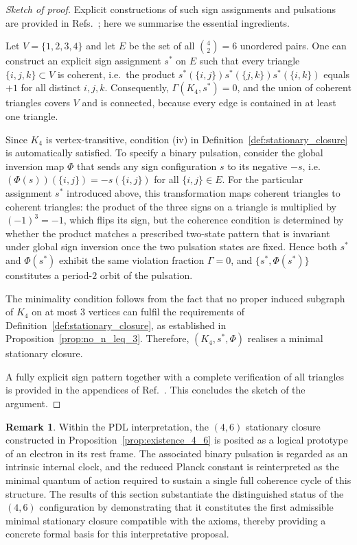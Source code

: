 \documentclass[11pt,a4paper]{article}
\theoremstyle{definition}
\newtheorem{remark}[theorem]{Remark}
\begin{document}
\begin{proof}[Sketch of proof]
Explicit constructions of such sign assignments and pulsations are provided in Refs.~\cite{PDL_Main_2026,PDL_Intro_2026}; here we summarise the essential ingredients.

Let $V=\{1,2,3,4\}$ and let $E$ be the set of all $\binom{4}{2}=6$ unordered pairs. One can construct an explicit sign assignment $s^\ast$ on $E$ such that every triangle $\{i,j,k\}\subset V$ is coherent, i.e.\ the product $s^\ast(\{i,j\})s^\ast(\{j,k\})s^\ast(\{i,k\})$ equals $+1$ for all distinct $i,j,k$.\cite{PDL_Main_2026} Consequently, $\Gamma(K_4,s^\ast)=0$, and the union of coherent triangles covers $V$ and is connected, because every edge is contained in at least one triangle.

Since $K_4$ is vertex-transitive, condition (iv) in Definition~\ref{def:stationary_closure} is automatically satisfied. To specify a binary pulsation, consider the global inversion map $\Phi$ that sends any sign configuration $s$ to its negative $-s$, i.e.\ $(\Phi(s))(\{i,j\}) = -s(\{i,j\})$ for all $\{i,j\}\in E$. For the particular assignment $s^\ast$ introduced above, this transformation maps coherent triangles to coherent triangles: the product of the three signs on a triangle is multiplied by $(-1)^3=-1$, which flips its sign, but the coherence condition is determined by whether the product matches a prescribed two-state pattern that is invariant under global sign inversion once the two pulsation states are fixed.\cite{PDL_Main_2026,PDL_Global_Mapping_2026} Hence both $s^\ast$ and $\Phi(s^\ast)$ exhibit the same violation fraction $\Gamma=0$, and $\{s^\ast,\Phi(s^\ast)\}$ constitutes a period-$2$ orbit of the pulsation.

The minimality condition follows from the fact that no proper induced subgraph of $K_4$ on at most $3$ vertices can fulfil the requirements of Definition~\ref{def:stationary_closure}, as established in Proposition~\ref{prop:no_n_leq_3}. Therefore, $(K_4,s^\ast,\Phi)$ realises a minimal stationary closure.

A fully explicit sign pattern together with a complete verification of all triangles is provided in the appendices of Ref.~\cite{PDL_Main_2026}. This concludes the sketch of the argument.
\end{proof}

\begin{remark}
Within the PDL interpretation, the $(4,6)$ stationary closure constructed in Proposition~\ref{prop:existence_4_6} is posited as a logical prototype of an electron in its rest frame.\cite{PDL_Main_2026,PDL_Global_Mapping_2026} The associated binary pulsation is regarded as an intrinsic internal clock, and the reduced Planck constant is reinterpreted as the minimal quantum of action required to sustain a single full coherence cycle of this structure. The results of this section substantiate the distinguished status of the $(4,6)$ configuration by demonstrating that it constitutes the first admissible minimal stationary closure compatible with the axioms, thereby providing a concrete formal basis for this interpretative proposal.
\end{remark}
\end{document}

